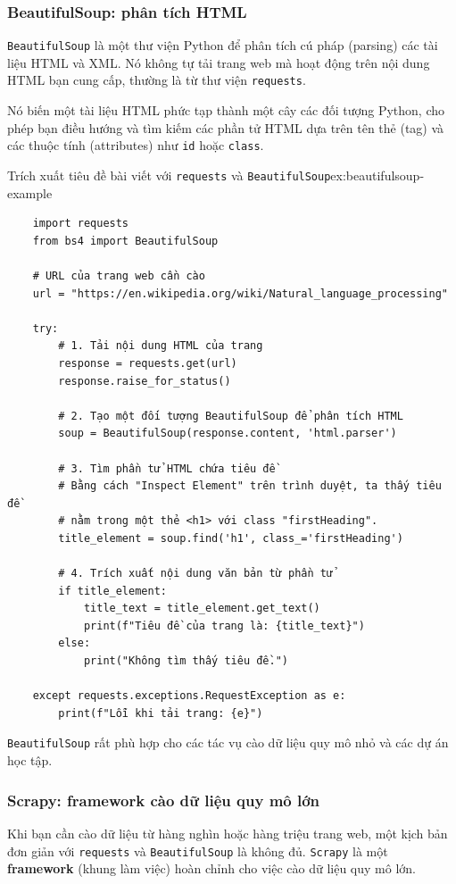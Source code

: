 \subsubsection{BeautifulSoup: phân tích HTML}
\texttt{BeautifulSoup} là một thư viện Python để phân tích cú pháp (parsing) các tài liệu HTML và XML. Nó không tự tải trang web mà hoạt động trên nội dung HTML bạn cung cấp, thường là từ thư viện \texttt{requests}.

Nó biến một tài liệu HTML phức tạp thành một cây các đối tượng Python, cho phép bạn điều hướng và tìm kiếm các phần tử HTML dựa trên tên thẻ (tag) và các thuộc tính (attributes) như \texttt{id} hoặc \texttt{class}.

\begin{example}{Trích xuất tiêu đề bài viết với \texttt{requests} và \texttt{BeautifulSoup}}{ex:beautifulsoup-example}
    \begin{verbatim}
    import requests
    from bs4 import BeautifulSoup

    # URL của trang web cần cào
    url = "https://en.wikipedia.org/wiki/Natural_language_processing"

    try:
        # 1. Tải nội dung HTML của trang
        response = requests.get(url)
        response.raise_for_status()
        
        # 2. Tạo một đối tượng BeautifulSoup để phân tích HTML
        soup = BeautifulSoup(response.content, 'html.parser')
        
        # 3. Tìm phần tử HTML chứa tiêu đề
        # Bằng cách "Inspect Element" trên trình duyệt, ta thấy tiêu đề
        # nằm trong một thẻ <h1> với class "firstHeading".
        title_element = soup.find('h1', class_='firstHeading')
        
        # 4. Trích xuất nội dung văn bản từ phần tử
        if title_element:
            title_text = title_element.get_text()
            print(f"Tiêu đề của trang là: {title_text}")
        else:
            print("Không tìm thấy tiêu đề.")
            
    except requests.exceptions.RequestException as e:
        print(f"Lỗi khi tải trang: {e}")
    \end{verbatim}
\end{example}
\texttt{BeautifulSoup} rất phù hợp cho các tác vụ cào dữ liệu quy mô nhỏ và các dự án học tập.

\subsubsection{Scrapy: framework cào dữ liệu quy mô lớn}
Khi bạn cần cào dữ liệu từ hàng nghìn hoặc hàng triệu trang web, một kịch bản đơn giản với \texttt{requests} và \texttt{BeautifulSoup} là không đủ. \texttt{Scrapy} là một \textbf{framework} (khung làm việc) hoàn chỉnh cho việc cào dữ liệu quy mô lớn.

